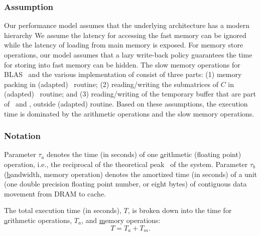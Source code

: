 \subsubsection*{Assumption}
Our performance model assumes that the underlying architecture has a modern  hierarchy 
We assume the latency for accessing the fast memory can be ignored  while the latency of loading from main memory is exposed.
For memory store operations, our model assumes that a lazy write-back policy guarantees the time for storing
into fast memory can be hidden.
The slow memory operations for BLAS \dgemm\ and the various implementation of \strassen{} consist of three
parts: (1) memory packing in (adapted) \dgemm\ routine; (2) reading/writing the submatrices of $C$ in (adapted) \dgemm\ routine; and (3) reading/writing of
the temporary buffer that are part of  \XXXstrassen\ and \ABXstrassen, outside (adapted) \dgemm{} routine.
Based on these assumptions, the execution time is dominated by the arithmetic operations and the slow memory operations.

\subsubsection*{Notation}
Parameter $\tau_{a}$  denotes the time (in seconds) of one \underline{a}rithmetic (floating point) operation, i.e., the reciprocal of the theoretical peak \GFLOPS\ of the system.
Parameter $\tau_{b}$ (\underline{b}andwidth, memory operation) denotes the amortized time (in seconds) of a unit (one double precision floating point number,
or eight bytes) of contiguous data movement from DRAM to cache.

The total execution time (in seconds), $ T $, is broken down into 
the time for \underline{a}rithmetic operations, $T_{a}$, and
\underline{m}emory operations:
\begin{equation}
  T=T_{a}+T_{m}.
  \label{e:etotal}
\end{equation}





